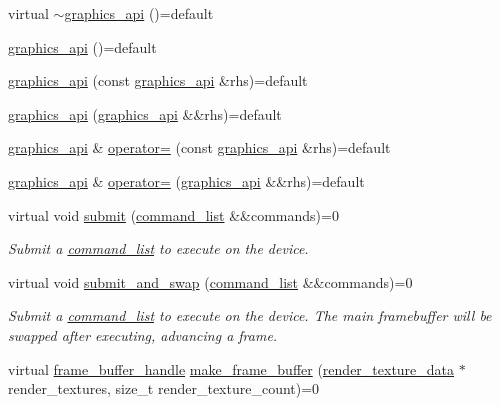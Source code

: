 \begin{DoxyCompactItemize}
\item 
virtual \mbox{\hyperlink{classmoka_1_1graphics__api_abd54303be7fb42a6d85092ebee5b605e}{$\sim$graphics\+\_\+api}} ()=default
\item 
\mbox{\hyperlink{classmoka_1_1graphics__api_a6f4cbced2ebc8383e60cc25217b839d7}{graphics\+\_\+api}} ()=default
\item 
\mbox{\hyperlink{classmoka_1_1graphics__api_a48c08e0eea506774961129654c297e06}{graphics\+\_\+api}} (const \mbox{\hyperlink{classmoka_1_1graphics__api}{graphics\+\_\+api}} \&rhs)=default
\item 
\mbox{\hyperlink{classmoka_1_1graphics__api_a25f5b4fa6fc7b42205e8e12843473121}{graphics\+\_\+api}} (\mbox{\hyperlink{classmoka_1_1graphics__api}{graphics\+\_\+api}} \&\&rhs)=default
\item 
\mbox{\hyperlink{classmoka_1_1graphics__api}{graphics\+\_\+api}} \& \mbox{\hyperlink{classmoka_1_1graphics__api_adb071783cb254101b7438f3f939c7806}{operator=}} (const \mbox{\hyperlink{classmoka_1_1graphics__api}{graphics\+\_\+api}} \&rhs)=default
\item 
\mbox{\hyperlink{classmoka_1_1graphics__api}{graphics\+\_\+api}} \& \mbox{\hyperlink{classmoka_1_1graphics__api_a81c169e6346ce2225fc50cb876c237f8}{operator=}} (\mbox{\hyperlink{classmoka_1_1graphics__api}{graphics\+\_\+api}} \&\&rhs)=default
\item 
virtual void \mbox{\hyperlink{classmoka_1_1graphics__api_abd438a03be4a08c1cd043a7cefa17cd9}{submit}} (\mbox{\hyperlink{classmoka_1_1command__list}{command\+\_\+list}} \&\&commands)=0
\begin{DoxyCompactList}\small\item\em Submit a \mbox{\hyperlink{classmoka_1_1command__list}{command\+\_\+list}} to execute on the device. \end{DoxyCompactList}\item 
virtual void \mbox{\hyperlink{classmoka_1_1graphics__api_a2b839d3a34c4eb88b0587e40f0616af3}{submit\+\_\+and\+\_\+swap}} (\mbox{\hyperlink{classmoka_1_1command__list}{command\+\_\+list}} \&\&commands)=0
\begin{DoxyCompactList}\small\item\em Submit a \mbox{\hyperlink{classmoka_1_1command__list}{command\+\_\+list}} to execute on the device. The main framebuffer will be swapped after executing, advancing a frame. \end{DoxyCompactList}\item 
virtual \mbox{\hyperlink{structmoka_1_1frame__buffer__handle}{frame\+\_\+buffer\+\_\+handle}} \mbox{\hyperlink{classmoka_1_1graphics__api_ac697780264c97703191fac805198be1e}{make\+\_\+frame\+\_\+buffer}} (\mbox{\hyperlink{structmoka_1_1render__texture__data}{render\+\_\+texture\+\_\+data}} $\ast$render\+\_\+textures, size\+\_\+t render\+\_\+texture\+\_\+count)=0

\end{DoxyCompactItemize}
